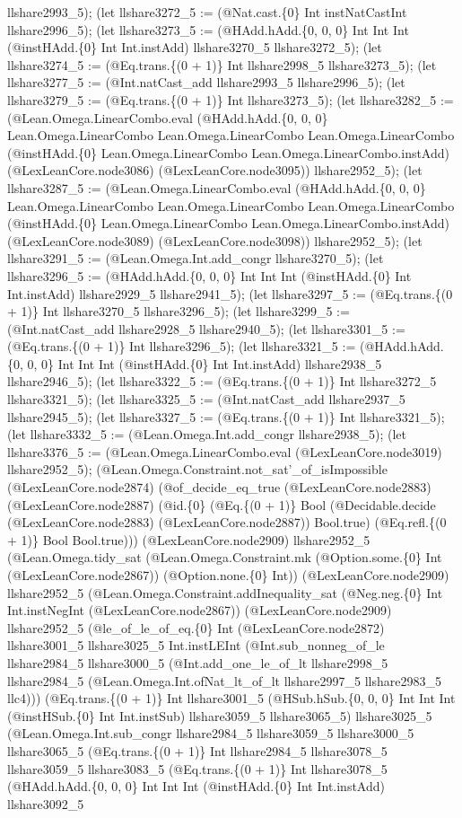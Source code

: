\documentclass[11pt]{article}
\begin{document}
llshare2993\_5); (let llshare3272\_5 := (@Nat.cast.\{0\} Int instNatCastInt llshare2996\_5); (let llshare3273\_5 := (@HAdd.hAdd.\{0, 0, 0\} Int Int Int (@instHAdd.\{0\} Int Int.instAdd) llshare3270\_5 llshare3272\_5); (let llshare3274\_5 := (@Eq.trans.\{(0 + 1)\} Int llshare2998\_5 llshare3273\_5); (let llshare3277\_5 := (@Int.natCast\_add llshare2993\_5 llshare2996\_5); (let llshare3279\_5 := (@Eq.trans.\{(0 + 1)\} Int llshare3273\_5); (let llshare3282\_5 := (@Lean.Omega.LinearCombo.eval (@HAdd.hAdd.\{0, 0, 0\} Lean.Omega.LinearCombo Lean.Omega.LinearCombo Lean.Omega.LinearCombo (@instHAdd.\{0\} Lean.Omega.LinearCombo Lean.Omega.LinearCombo.instAdd) (@LexLeanCore.node3086) (@LexLeanCore.node3095)) llshare2952\_5); (let llshare3287\_5 := (@Lean.Omega.LinearCombo.eval (@HAdd.hAdd.\{0, 0, 0\} Lean.Omega.LinearCombo Lean.Omega.LinearCombo Lean.Omega.LinearCombo (@instHAdd.\{0\} Lean.Omega.LinearCombo Lean.Omega.LinearCombo.instAdd) (@LexLeanCore.node3089) (@LexLeanCore.node3098)) llshare2952\_5); (let llshare3291\_5 := (@Lean.Omega.Int.add\_congr llshare3270\_5); (let llshare3296\_5 := (@HAdd.hAdd.\{0, 0, 0\} Int Int Int (@instHAdd.\{0\} Int Int.instAdd) llshare2929\_5 llshare2941\_5); (let llshare3297\_5 := (@Eq.trans.\{(0 + 1)\} Int llshare3270\_5 llshare3296\_5); (let llshare3299\_5 := (@Int.natCast\_add llshare2928\_5 llshare2940\_5); (let llshare3301\_5 := (@Eq.trans.\{(0 + 1)\} Int llshare3296\_5); (let llshare3321\_5 := (@HAdd.hAdd.\{0, 0, 0\} Int Int Int (@instHAdd.\{0\} Int Int.instAdd) llshare2938\_5 llshare2946\_5); (let llshare3322\_5 := (@Eq.trans.\{(0 + 1)\} Int llshare3272\_5 llshare3321\_5); (let llshare3325\_5 := (@Int.natCast\_add llshare2937\_5 llshare2945\_5); (let llshare3327\_5 := (@Eq.trans.\{(0 + 1)\} Int llshare3321\_5); (let llshare3332\_5 := (@Lean.Omega.Int.add\_congr llshare2938\_5); (let llshare3376\_5 := (@Lean.Omega.LinearCombo.eval (@LexLeanCore.node3019) llshare2952\_5); (@Lean.Omega.Constraint.not\_sat'\_of\_isImpossible (@LexLeanCore.node2874) (@of\_decide\_eq\_true (@LexLeanCore.node2883) (@LexLeanCore.node2887) (@id.\{0\} (@Eq.\{(0 + 1)\} Bool (@Decidable.decide (@LexLeanCore.node2883) (@LexLeanCore.node2887)) Bool.true) (@Eq.refl.\{(0 + 1)\} Bool Bool.true))) (@LexLeanCore.node2909) llshare2952\_5 (@Lean.Omega.tidy\_sat (@Lean.Omega.Constraint.mk (@Option.some.\{0\} Int (@LexLeanCore.node2867)) (@Option.none.\{0\} Int)) (@LexLeanCore.node2909) llshare2952\_5 (@Lean.Omega.Constraint.addInequality\_sat (@Neg.neg.\{0\} Int Int.instNegInt (@LexLeanCore.node2867)) (@LexLeanCore.node2909) llshare2952\_5 (@le\_of\_le\_of\_eq.\{0\} Int (@LexLeanCore.node2872) llshare3001\_5 llshare3025\_5 Int.instLEInt (@Int.sub\_nonneg\_of\_le llshare2984\_5 llshare3000\_5 (@Int.add\_one\_le\_of\_lt llshare2998\_5 llshare2984\_5 (@Lean.Omega.Int.ofNat\_lt\_of\_lt llshare2997\_5 llshare2983\_5 llc4))) (@Eq.trans.\{(0 + 1)\} Int llshare3001\_5 (@HSub.hSub.\{0, 0, 0\} Int Int Int (@instHSub.\{0\} Int Int.instSub) llshare3059\_5 llshare3065\_5) llshare3025\_5 (@Lean.Omega.Int.sub\_congr llshare2984\_5 llshare3059\_5 llshare3000\_5 llshare3065\_5 (@Eq.trans.\{(0 + 1)\} Int llshare2984\_5 llshare3078\_5 llshare3059\_5 llshare3083\_5 (@Eq.trans.\{(0 + 1)\} Int llshare3078\_5 (@HAdd.hAdd.\{0, 0, 0\} Int Int Int (@instHAdd.\{0\} Int Int.instAdd) llshare3092\_5 
\end{document}
